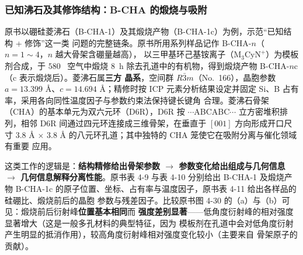 \subsubsection{已知沸石及其修饰结构：B-CHA 的煅烧与吸附}

原书以硼硅菱沸石（B-CHA-1）及其煅烧产物（B-CHA-1c）为例，示范``已知结构 + 修饰''这一类
问题的完整链条。原书所用系列样品记作 B-CHA-$n$（$n=1\sim4$，$n$ 越大骨架含硼量越高），
以三甲基环己基铵离子（$\mathrm{M_3CyN^{+}}$）为模板剂合成，于 $580$~\degC{} 空气中煅烧
$8$~h 除去孔道中的有机物，得到煅烧产物 B-CHA-$n$c（c 表示煅烧后）。菱沸石属\textbf{三方
晶系}，空间群 $R\bar{3}m$（No.~166），晶胞参数 $a=13.399$ Å、$c=14.694$ Å；精修时按
ICP 元素分析结果设定并固定 Si、B 占有率，采用各向同性温度因子与参数约束法保持键长键角
合理。菱沸石骨架（CHA）的基本单元为双六元环（D6R），D6R 按 $\cdots$ABCABC$\cdots$
立方密堆积排列，相邻 D6R 间通过四元环连接成三维骨架，在垂直于 $[001]$ 方向形成开口尺寸
$3.8$ Å $\times$ $3.8$ Å 的八元环孔道；其中独特的 CHA 笼使它在吸附分离与催化领域有重要
应用。

\begin{principle}
这类工作的逻辑是：\textbf{结构精修给出骨架参数 $\rightarrow$ 参数变化给出组成与几何信息
$\rightarrow$ 几何信息解释分离性能}。原书表 4-9 与表 4-10 分别给出 B-CHA-1 及煅烧产物
B-CHA-1c 的原子位置、坐标、占有率与温度因子，原书表 4-11 给出各样品的硅硼比、煅烧前后的晶胞
参数与残差因子。比较原书图 4-30 的（a）与（b）可见：煅烧前后衍射峰\textbf{位置基本相同}而
\textbf{强度差别显著}——低角度衍射峰的相对强度显著增大（这是一般多孔材料的典型特征，因为
模板剂在孔道中会对低角度衍射产生明显的抵消作用），较高角度衍射峰相对强度变化较小（主要来自
骨架原子的贡献）。
\end{principle}

